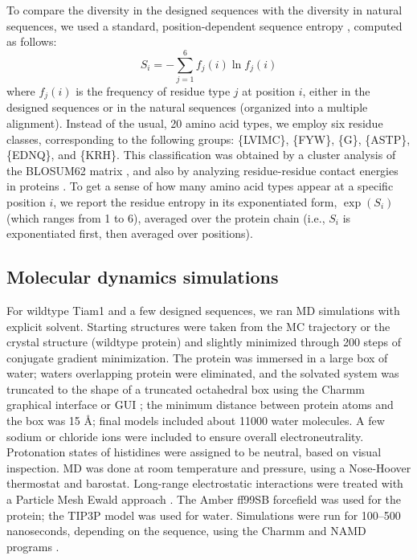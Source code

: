\documentclass[12pt]{article}
\begin{document}
To compare the diversity in the designed sequences with the diversity in natural sequences, we used a standard,
position-dependent sequence entropy \cite{DurbinBK}, computed as follows:
\begin{equation} \label{eq:entropy}
S_i = - \sum_{j=1}^6 f_j (i) \ln f_j (i)
\end{equation}
where $f_j(i)$ is the frequency of residue type $j$ at position $i$, either in the designed sequences or in the
natural sequences (organized into a multiple alignment). Instead of the usual, 20 amino acid types, we employ
six residue classes, corresponding to the following groups: \{LVIMC\}, \{FYW\}, \{G\}, \{ASTP\}, \{EDNQ\}, and
\{KRH\}. This classification was obtained by a cluster analysis of the BLOSUM62 matrix \cite{Murphy02}, and also
by analyzing residue-residue contact energies in proteins \cite{Launay07}. To get a sense of how many amino acid
types appear at a specific position $i$, we report the residue entropy in its exponentiated form, $\exp(S_i)$
(which ranges from 1 to 6), averaged over the protein chain (i.e., $S_i$ is exponentiated first, then averaged
over positions).

\subsection{Molecular dynamics simulations}
For wildtype Tiam1 and a few designed sequences, we ran MD simulations with explicit solvent. Starting structures were
taken from the MC trajectory or the crystal structure (wildtype protein) and slightly minimized through 200 steps of
conjugate gradient minimization. The protein was immersed in a large box of water; waters overlapping protein were
eliminated, and the solvated system was truncated to the shape of a truncated octahedral box using the Charmm graphical
interface or GUI \cite{Jo08}; the minimum distance between protein atoms and the box was 15 {\AA}; final models included
about 11000 water molecules. A few sodium or chloride ions were included to ensure overall electroneutrality. Protonation
states of histidines were assigned to be neutral, based on visual inspection. MD was done at room temperature and pressure,
using a Nose-Hoover thermostat and barostat. Long-range electrostatic interactions were treated with a Particle Mesh Ewald
approach \cite{DardenBK}. The Amber ff99SB forcefield was used for the protein; the TIP3P model \cite{Jorgensen83} was
used for water. Simulations were run for 100--500 nanoseconds, depending on the sequence, using the Charmm and NAMD programs
\cite{Brooks09,NAMD}.
\end{document}
